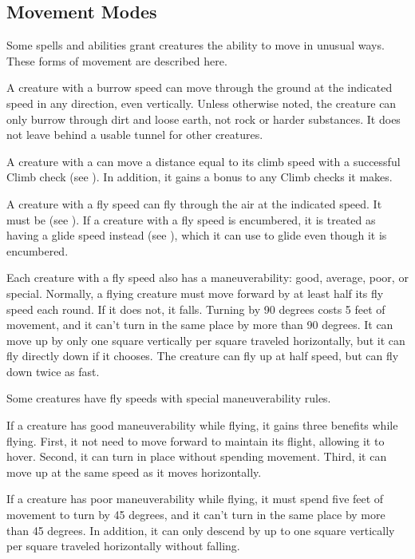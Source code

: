     \subsection{Movement Modes}\label{Movement Modes}
        Some spells and abilities grant creatures the ability to move in unusual ways. These forms of movement are described here.

        A creature with a burrow speed can move through the ground at the indicated speed in any direction, even vertically. Unless otherwise noted, the creature can only burrow through dirt and loose earth, not rock or harder substances. It does not leave behind a usable tunnel for other creatures.

        A creature with a  can move a distance equal to its climb speed with a successful Climb check (see ).
        In addition, it gains a  bonus to any Climb checks it makes.

        \label{Flying}
        A creature with a fly speed can fly through the air at the indicated speed. It must be  (see ). If a creature with a fly speed is encumbered, it is treated as having a glide speed instead (see ), which it can use to glide even though it is encumbered.

        Each creature with a fly speed also has a maneuverability: good, average, poor, or special. Normally, a flying creature must move forward by at least half its fly speed each round. If it does not, it falls. Turning by 90 degrees costs 5 feet of movement, and it can't turn in the same place by more than 90 degrees. It can move up by only one square vertically per square traveled horizontally, but it can fly directly down if it chooses. The creature can fly up at half speed, but can fly down twice as fast.

        \label{Maneuverability} Some creatures have fly speeds with special maneuverability rules.

         If a creature has good maneuverability while flying, it gains three benefits while flying.
        First, it not need to move forward to maintain its flight, allowing it to hover.
        Second, it can turn in place without spending movement.
        Third, it can move up at the same speed as it moves horizontally.

         If a creature has poor maneuverability while flying, it must spend five feet of movement to turn by 45 degrees, and it can't turn in the same place by more than 45 degrees. In addition, it can only descend by up to one square vertically per square traveled horizontally without falling.

